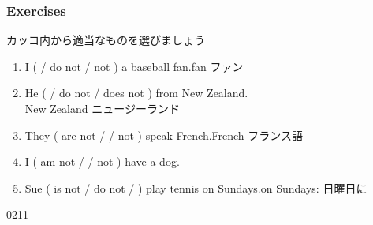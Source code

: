 \documentclass[aspectratio=169,xcolor={dvipsnames,table}]{beamer}
\newcommand{\myaudio}[1]{\href{#1}{\faVolumeUp}}
\begin{document}
\begin{frame}[plain]\frametitle{Exercises}
カッコ内から適当なものを選びましょう%

\begin{enumerate}
 \item I (  / do not / not ) a baseball fan.\hfill{\scriptsize fan  ファン}
 \item He (   / do not  / does not ) from New Zealand.\\
\hfill{\scriptsize New Zealand   ニュージーランド}
 \item They ( are not /   / not ) speak French.\hfill{\scriptsize French  フランス語}
 \item I ( am not /  / not ) have a dog.
 \item Sue ( is not / do not /   ) play tennis on Sundays.\hfill{\scriptsize on Sundays:} {\tiny 日曜日に}
\end{enumerate}

\hfill{\tiny 0211}\,{\scriptsize\myaudio{audio/007_negative_do_03.mp3}}



\end{frame}
\end{document}
